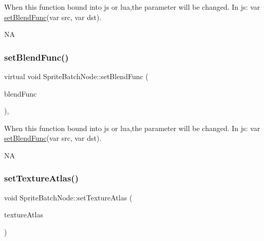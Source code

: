 \begin{DoxyCode}
When \textcolor{keyword}{this} \textcolor{keyword}{function} bound into js or lua,the parameter will be changed.
In js: var \hyperlink{classSpriteBatchNode_aea7694e73e37e957179a5d82565348e9}{setBlendFunc}(var src, var dst).
\end{DoxyCode}
  NA \mbox{\label{classSpriteBatchNode_a6cf0c9ae034ec3418a019846b1d93efc}} 
\subsubsection{\texorpdfstring{set\+Blend\+Func()}{setBlendFunc()}\hspace{0.1cm}{\footnotesize\ttfamily [2/2]}}
{\footnotesize\ttfamily virtual void Sprite\+Batch\+Node\+::set\+Blend\+Func (\begin{DoxyParamCaption}\item[{const \hyperlink{structBlendFunc}{Blend\+Func} \&}]{blend\+Func }\end{DoxyParamCaption})\hspace{0.3cm}{\ttfamily [override]}, {\ttfamily [virtual]}}


\begin{DoxyCode}
When \textcolor{keyword}{this} \textcolor{keyword}{function} bound into js or lua,the parameter will be changed.
In js: var \hyperlink{classSpriteBatchNode_aea7694e73e37e957179a5d82565348e9}{setBlendFunc}(var src, var dst).
\end{DoxyCode}
  NA \mbox{\label{classSpriteBatchNode_a53497de819859ff84079d77e11cbd512}} 
\subsubsection{\texorpdfstring{set\+Texture\+Atlas()}{setTextureAtlas()}\hspace{0.1cm}{\footnotesize\ttfamily [1/2]}}
{\footnotesize\ttfamily void Sprite\+Batch\+Node\+::set\+Texture\+Atlas (\begin{DoxyParamCaption}\item[{\hyperlink{classTextureAtlas}{Texture\+Atlas} $\ast$}]{texture\+Atlas }\end{DoxyParamCaption})\hspace{0.3cm}{\ttfamily [inline]}}

